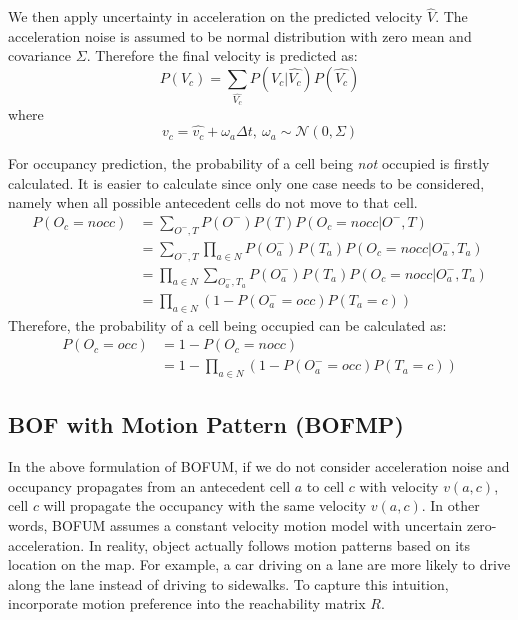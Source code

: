 We then apply uncertainty in acceleration on the predicted velocity $\hat{V}$. The acceleration noise is assumed to be normal distribution with zero mean and covariance $\Sigma$. Therefore the final velocity is predicted as:
\begin{equation}
P(V_c) = \sum_{\hat{V_c}}{P(V_c|\hat{V_c})P(\hat{V_c})} \label{eq:adding_noise}
\end{equation}
where
\begin{equation}
v_c = \hat{v_c} + \omega_a \Delta t, \ \omega_a \sim \mathcal{N}(0, \Sigma) \label{eq:adding_noise}
\end{equation}

For occupancy prediction, the probability of a cell being \textit{not} occupied is firstly calculated. It is easier to calculate since only one case needs to be considered, namely when all possible antecedent cells do not move to that cell.
\begin{align}
P(O_c=nocc) &= \sum_{O^-, T} P(O^-)P(T)P(O_c=nocc|O^-,T) \\
            &= \sum_{O^-, T}\prod_{a \in N} P(O_a^-)P(T_a)P(O_c=nocc|O^-_a,T_a) \\
            &= \prod_{a \in N} \sum_{O_a^-, T_a} P(O_a^-)P(T_a)P(O_c=nocc|O^-_a,T_a) \\
            &= \prod_{a \in N} (1-P(O_a^-=occ)P(T_a=c))
\end{align}
Therefore, the probability of a cell being occupied can be calculated as:
\begin{align}
P(O_c=occ) &= 1 - P(O_c=nocc) \\
           &= 1 - \prod_{a \in N}{(1-P(O_a^-=occ)P(T_a=c))}
\end{align}

\subsection{BOF with Motion Pattern (BOFMP)} \label{sec:bofmp}

In the above formulation of BOFUM, if we do not consider acceleration noise and occupancy propagates from an antecedent cell $a$ to cell $c$ with velocity $v(a,c)$, cell $c$ will propagate the occupancy with the same velocity $v(a,c)$. In other words, BOFUM assumes a constant velocity motion model with uncertain zero-acceleration. In reality, object actually follows motion patterns based on its location on the map. For example, a car driving on a lane are more likely to drive along the lane instead of driving to sidewalks. To capture this intuition, \citet{gindele2009bayesian} incorporate motion preference into the reachability matrix $R$.

